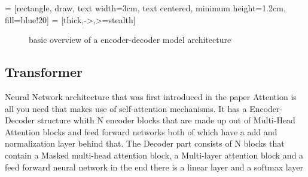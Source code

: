  = [rectangle, draw, text width=3cm, text centered, minimum height=1.2cm, fill=blue!20]
 = [thick,->,>=stealth]
\begin{figure}
    \centering
{}
\label{fig:encoder-decoder model}
\caption{basic overview of a encoder-decoder model architecture}
\end{figure}

\subsection{Transformer}
Neural Network architecture that was first introduced in the paper Attention is all you need \cite{vaswani2023attentionneed} that makes use of self-attention mechanisms. 
It has a Encoder-Decoder structure whith N encoder blocks that are made up out of Multi-Head Attention blocks and feed forward networks both of which have a add and normalization layer behind that. 
The Decoder part consists of N blocks that contain a Masked multi-head attention block, a Multi-layer attention block and a feed forward neural network 
in the end there is a linear layer and a softmax layer

